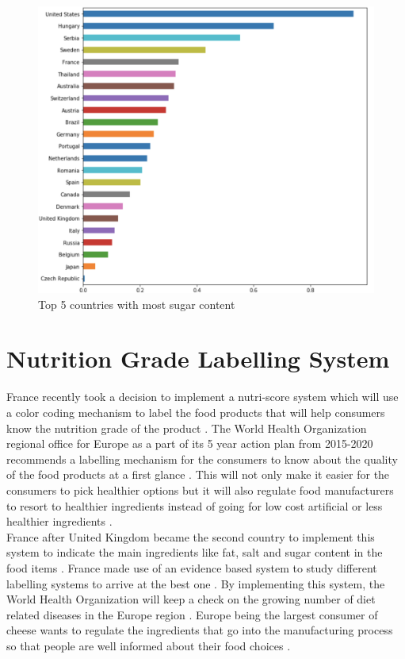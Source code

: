 \documentclass[sigconf]{acmart}
\begin{document}
\begin{figure}
\includegraphics[width=1.0\columnwidth]{images/fig13.png}
\caption{Top 5 countries with most sugar content \cite{code-base}}
\label{fig:Fig13}
\end{figure} 

\section{Nutrition Grade Labelling System}
France recently took a decision to implement a nutri-score system which will use a color coding mechanism to label the food products that will help consumers know the nutrition grade of the product \cite{www-who}. The World Health Organization regional office for Europe as a part of its 5 year action plan from 2015-2020 recommends a labelling mechanism for the consumers to know about the quality of the food products at a first glance \cite{www-who}. This will not only make it easier for the consumers to pick healthier options but it will also regulate food manufacturers to resort to healthier ingredients instead of going for low cost artificial or less healthier ingredients \cite{www-who}.  \\

France after United Kingdom became the second country to implement this system to indicate the main ingredients like fat, salt and sugar content in the food items \cite{www-who}. France made use of an evidence based system to study different labelling systems to arrive at the best one \cite{www-who}. By implementing this system, the World Health Organization will keep a check on the growing number of diet related diseases in the Europe region \cite{www-who}. Europe being the largest consumer of cheese wants to regulate the ingredients that go into the manufacturing process so that people are well informed about their food choices \cite{www-who}.
\end{document}
